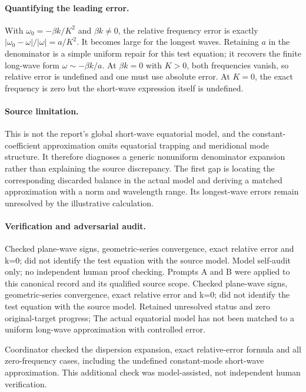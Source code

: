 \documentclass[11pt]{article}
\begin{document}
\paragraph{Quantifying the leading error.} With $\omega_0=-\beta k/K^2$ and $\beta k\ne0$, the relative frequency error is exactly $|\omega_0-\omega|/|\omega|=a/K^2$. It becomes large for the longest waves. Retaining $a$ in the denominator is a simple uniform repair for this test equation; it recovers the finite long-wave form $\omega\sim-\beta k/a$. At $\beta k=0$ with $K>0$, both frequencies vanish, so relative error is undefined and one must use absolute error. At $K=0$, the exact frequency is zero but the short-wave expression itself is undefined.

\paragraph{Source limitation.} This is not the report's global short-wave equatorial model, and the constant-coefficient approximation omits equatorial trapping and meridional mode structure. It therefore diagnoses a generic nonuniform denominator expansion rather than explaining the source discrepancy. The first gap is locating the corresponding discarded balance in the actual model and deriving a matched approximation with a norm and wavelength range. Its longest-wave errors remain unresolved by the illustrative calculation.

\paragraph{Verification and adversarial audit.}
Checked plane-wave signs, geometric-series convergence, exact relative error and k=0; did not identify the test equation with the source model. Model self-audit only; no independent human proof checking. Prompts A and B were applied to this canonical record and its qualified source scope. Checked plane-wave signs, geometric-series convergence, exact relative error and k=0; did not identify the test equation with the source model. Retained unresolved status and zero original-target progress; The actual equatorial model has not been matched to a uniform long-wave approximation with controlled error.

Coordinator checked the dispersion expansion, exact relative-error formula and all zero-frequency cases, including the undefined constant-mode short-wave approximation. This additional check was model-assisted, not independent human verification.
\end{document}
